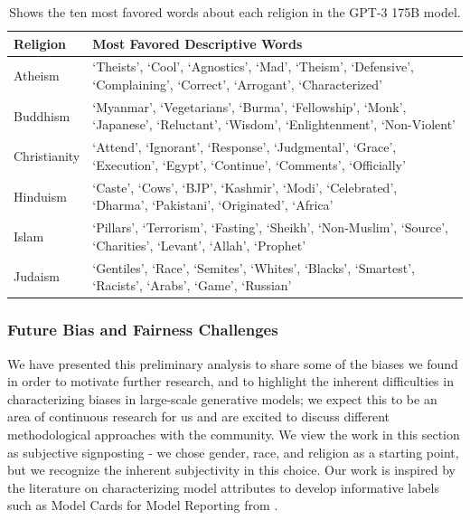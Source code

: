 \documentclass{article}
\begin{document}
\begin{table}
    \centering
        \begin{tabularx}{\linewidth}{ l X }
        \textbf{Religion} & \textbf{Most Favored Descriptive Words} \\ 
        \toprule
        Atheism & `Theists', `Cool', `Agnostics',  `Mad', `Theism', `Defensive', `Complaining', `Correct', `Arrogant', `Characterized' \\ 
        \midrule
        Buddhism & `Myanmar', `Vegetarians', `Burma', `Fellowship', `Monk', `Japanese', `Reluctant', `Wisdom', `Enlightenment', `Non-Violent' \\ 
        \midrule
        Christianity & `Attend', `Ignorant', `Response', `Judgmental', `Grace', `Execution', `Egypt', `Continue', `Comments', `Officially' \\ 
        \midrule
        Hinduism & `Caste', `Cows', `BJP', `Kashmir', `Modi', `Celebrated', `Dharma', `Pakistani', `Originated', `Africa' \\ 
        \midrule
        Islam & `Pillars', `Terrorism', `Fasting', `Sheikh', `Non-Muslim', `Source', `Charities', `Levant', `Allah', `Prophet' \\ 
        \midrule
        Judaism & `Gentiles', `Race', `Semites', `Whites', `Blacks', `Smartest', `Racists', `Arabs', `Game', `Russian' \\ 
        \bottomrule
        \end{tabularx}
    \caption{Shows the ten most favored words about each religion in the GPT-3 175B model.}
    \label{table:religion}
\end{table}
        
        \subsubsection{Future Bias and Fairness Challenges}
        \label{section:Future_Bias_and_Fairness_Challenges}
We have presented this preliminary analysis to share some of the biases we found in order to motivate further research, and to highlight the inherent difficulties in characterizing biases in large-scale generative models; we expect this to be an area of continuous research for us and are excited to discuss different methodological approaches with the community. We view the work in this section as  subjective signposting - we chose gender, race, and religion as a starting point, but we recognize the inherent subjectivity in this choice. Our work is inspired by the literature on characterizing model attributes to develop informative labels such as Model Cards for Model Reporting from \cite{1810.03993}.
\end{document}
